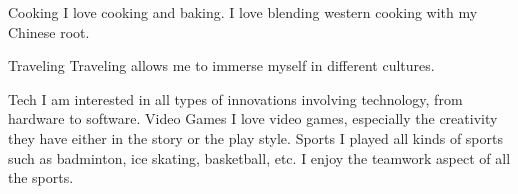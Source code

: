 



\begin{cvskills}
  \cvskill
    {Cooking} %
    {I love cooking and baking. I love blending western cooking with my Chinese root.} %


  \cvskill
    {Traveling} %
    {Traveling allows me to immerse myself in different cultures.} %

  \cvskill
    {Tech} %
    {I am interested in all types of innovations involving technology, from hardware to software.} %
  \cvskill
    {Video Games} %
    {I love video games, especially the creativity they have either in the story or the play style.} %
  \cvskill
    {Sports} %
    {I played all kinds of sports such as badminton, ice skating, basketball, etc. I enjoy the teamwork aspect of all the sports.} %

\end{cvskills}